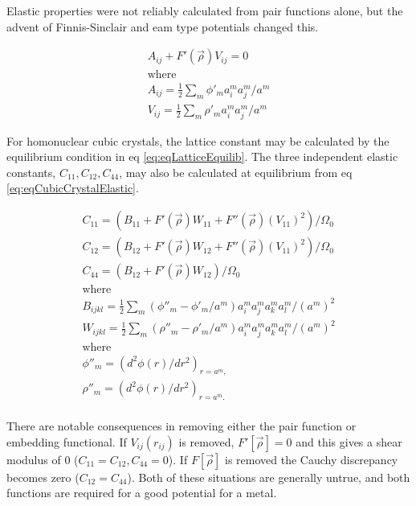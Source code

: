 Elastic properties were not reliably calculated from pair functions alone\cite{dawbaskeseam}, but the advent of Finnis-Sinclair and \acrshort{eam} type potentials changed this.  

\begin{equation}
\begin{split}
A_{ij} + F'(\vec{\rho}) V_{ij} = 0 \\
\text{where} \\
A_{ij} = \frac{1}{2} \sum_{m} \phi'_m a_i^m a_j^m / a^m \\
V_{ij} = \frac{1}{2} \sum_{m} \rho'_m a_i^m a_j^m / a^m 
\end{split}
\label{eq:eqLatticeEquilib}
\end{equation}

For homonuclear cubic crystals, the lattice constant may be calculated by the equilibrium condition in eq \ref{eq:eqLatticeEquilib}.  The three independent elastic constants, $C_{11}, C_{12}, C_{44}$, may also be calculated at equilibrium from eq \ref{eq:eqCubicCrystalElastic}.  

\begin{equation}
\begin{split}
C_{11} = \left( B_{11} + F'(\vec{\rho}) W_{11} + F''(\vec{\rho})(V_{11})^2 \right) / \Omega_0 \\
C_{12} = \left( B_{12} + F'(\vec{\rho}) W_{12} + F''(\vec{\rho})(V_{11})^2 \right) / \Omega_0 \\
C_{44} = \left( B_{12} + F'(\vec{\rho}) W_{12} \right) / \Omega_0 \\
\text{where} \\
B_{ijkl} = \frac{1}{2} \sum_m \left(\phi''_m-\phi'_m/a^m \right) a_i^m a_j^m a_k^m a_l^m/(a^m)^2 \\
W_{ijkl} = \frac{1}{2} \sum_m \left(\rho''_m-\rho'_m/a^m \right) a_i^m a_j^m a_k^m a_l^m/(a^m)^2 \\
\text{where} \\
\phi''_m = \left(d^2\phi(r)/dr^2 \right)_{r=a^m,}\\
\rho''_m = \left(d^2\phi(r)/dr^2 \right)_{r=a^m.}\\
\end{split}
\label{eq:eqCubicCrystalElastic}
\end{equation}

There are notable consequences in removing either the pair function or embedding functional.  If $V_{ij}(r_{ij})$ is removed, $F'[\vec{\rho}] = 0$ and this gives a shear modulus of 0 ($C_{11} = C_{12}, C_{44} = 0$)\cite{dawbaskeseam}.  If $F[\vec{\rho}]$  is removed the Cauchy discrepancy becomes zero ($C_{12} = C_{44}$)\cite{dawbaskeseam}.  Both of these situations are generally untrue, and both functions are required for a good potential for a metal.



